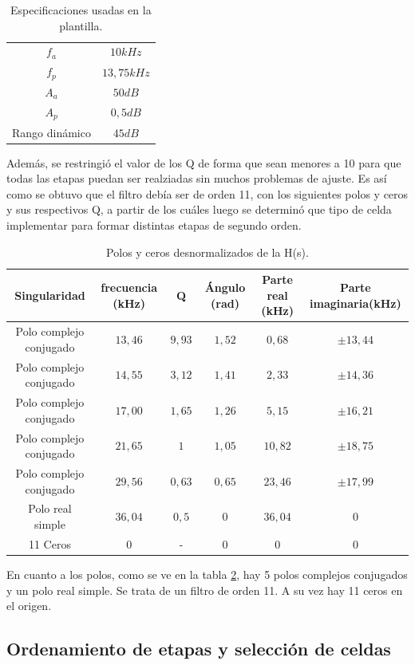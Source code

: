 	\begin{table}[H]
	\centering
	\begin{tabular}{c c}
		\hline
		$f_a$ & $10kHz$\\
		$f_p$ & $13,75kHz$\\
		$A_a$ & $50dB$\\
		$A_p$ & $0,5dB$\\
		Rango din\'amico & $45dB$\\	
		\hline
	\end{tabular}
	\caption{Especificaciones usadas en la plantilla.}
	\label{plantilla}
\end{table}

Adem\'as, se restringi\'o el valor de los Q de forma que sean menores a 10 para que todas las etapas puedan ser realziadas sin muchos problemas de ajuste. Es as\'i como se obtuvo que el filtro deb\'ia ser de orden 11, con los siguientes polos y ceros y sus respectivos Q, a partir de los cu\'ales luego se determin\'o que tipo de celda implementar para formar distintas etapas de segundo orden.


\begin{table}[H]
	\centering
	\begin{tabular}{c c c c c c}
		\hline
		Singularidad & frecuencia (kHz) & Q & \'Angulo (rad) & Parte real (kHz) & Parte imaginaria(kHz)\\
		\hline
		Polo complejo conjugado& $13,46$ & $9,93$&$1,52$ &$0,68$ & $\pm13,44$ \\ 
		Polo complejo conjugado &  $14,55$ & $3,12$& $1,41$& $2,33$ & $\pm14,36$\\
		Polo complejo conjugado & $17,00$&$1,65$&$1,26$&$5,15$&$\pm16,21$\\
		Polo complejo conjugado & $21,65$&$1$&$1,05$&$10,82$&$\pm18,75$\\
		Polo complejo conjugado & $29,56$&$0,63$&$0,65$&$23,46$&$\pm17,99$\\
		Polo real simple & $36,04$ &$0,5$&$0$&$36,04$&$0$\\
		11 Ceros & $0$ & - &$0$&$0$&$0$\\
		\hline
	\end{tabular}
	\caption{Polos y ceros desnormalizados de la H(s).}
	\label{pyc}
\end{table}

En cuanto a los polos, como se ve en la tabla \ref{pyc}, hay 5 polos complejos conjugados y un polo real simple. Se trata de un filtro de orden 11. A su vez hay 11 ceros en el origen. 

\subsection{Ordenamiento de etapas y selecci\'on de celdas}

